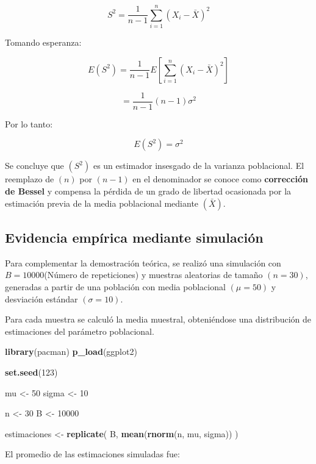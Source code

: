\documentclass[
  11pt,
]{report}
\newenvironment{Shaded}{\begin{snugshade}}{\end{snugshade}}
\newcommand{\DecValTok}[1]{\textcolor[rgb]{0.00,0.00,0.81}{#1}}
\newcommand{\FunctionTok}[1]{\textcolor[rgb]{0.13,0.29,0.53}{\textbf{#1}}}
\newcommand{\NormalTok}[1]{#1}
\newcommand{\OtherTok}[1]{\textcolor[rgb]{0.56,0.35,0.01}{#1}}
\begin{document}
\[S^2
=
\frac{1}{n-1}
\sum_{i=1}^{n}
(X_i-\bar X)^2\]

Tomando esperanza:

\[E(S^2)
=
\frac{1}{n-1}
E\left[
\sum_{i=1}^{n}
(X_i-\bar X)^2
\right]\]

\[=
\frac{1}{n-1}
(n-1)\sigma^2\]

Por lo tanto:

\[E(S^2)
=
\sigma^2\]

Se concluye que \((S^2)\) es un estimador insesgado de la varianza
poblacional. El reemplazo de \((n)\) por \((n-1)\) en el denominador se
conoce como \textbf{corrección de Bessel} y compensa la pérdida de un
grado de libertad ocasionada por la estimación previa de la media
poblacional mediante \((\bar X)\).

\subsection{Evidencia empírica mediante
simulación}\label{evidencia-empuxedrica-mediante-simulaciuxf3n}

Para complementar la demostración teórica, se realizó una simulación con
\(B=10000\)(Número de repeticiones) y muestras aleatorias de tamaño
\((n=30)\), generadas a partir de una población con media poblacional
\((\mu=50)\) y desviación estándar \((\sigma=10)\).

Para cada muestra se calculó la media muestral, obteniéndose una
distribución de estimaciones del parámetro poblacional.

\begin{Shaded}
\begin{Highlighting}[]
\FunctionTok{library}\NormalTok{(pacman)}
\FunctionTok{p\_load}\NormalTok{(ggplot2)}

\FunctionTok{set.seed}\NormalTok{(}\DecValTok{123}\NormalTok{)}

\NormalTok{mu }\OtherTok{\textless{}{-}} \DecValTok{50}
\NormalTok{sigma }\OtherTok{\textless{}{-}} \DecValTok{10}

\NormalTok{n }\OtherTok{\textless{}{-}} \DecValTok{30}
\NormalTok{B }\OtherTok{\textless{}{-}} \DecValTok{10000}

\NormalTok{estimaciones }\OtherTok{\textless{}{-}} \FunctionTok{replicate}\NormalTok{(}
\NormalTok{  B,}
  \FunctionTok{mean}\NormalTok{(}\FunctionTok{rnorm}\NormalTok{(n, mu, sigma))}
\NormalTok{)}
\end{Highlighting}
\end{Shaded}

El promedio de las estimaciones simuladas fue:
\end{document}
